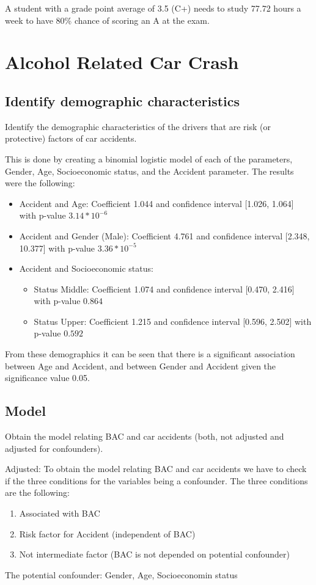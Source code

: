 A student with a grade point average of 3.5 (C+) needs to study 77.72 hours a week to have 80\% chance of scoring an A at the exam.


\section{Alcohol Related Car Crash}

\subsection{Identify demographic characteristics}
Identify the demographic characteristics of the drivers that are risk (or protective) factors of car accidents.

This is done by creating a binomial logistic model of each of the parameters, Gender, Age, Socioeconomic status, and the Accident parameter.
The results were the following:

\begin{itemize}
    \item Accident and Age: Coefficient 1.044 and confidence interval [1.026, 1.064] with p-value $3.14*10^{-6}$
    \item Accident and Gender (Male): Coefficient 4.761 and confidence interval [2.348, 10.377] with p-value $3.36*10^{-5}$
    \item Accident and Socioeconomic status: 
    \begin{itemize}
        \item Status Middle: Coefficient 1.074 and confidence interval [0.470, 2.416] with p-value $0.864$
        \item Status Upper: Coefficient 1.215 and confidence interval [0.596, 2.502] with p-value $0.592$
    \end{itemize}
\end{itemize}

From these demographics it can be seen that there is a significant association between Age and Accident, and between Gender and Accident given the significance value 0.05.

\subsection{Model}

Obtain the model relating BAC and car accidents (both, not adjusted and adjusted for confounders). 

Adjusted:
To obtain the model relating BAC and car accidents we have to check if the three conditions for the variables being a confounder. The three conditions are the following:
\begin{enumerate}
    \item Associated with BAC
    \item Risk factor for Accident (independent of BAC)
    \item Not intermediate factor (BAC is not depended on potential confounder)
\end{enumerate}
The potential confounder: Gender, Age, Socioeconomin status

